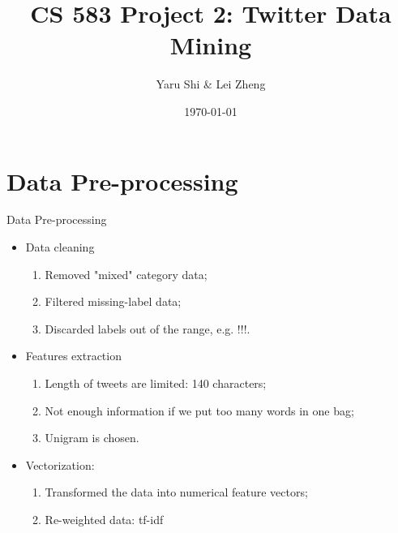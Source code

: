 \documentclass{beamer}
\title[Your Short Title]{CS 583 Project 2: Twitter Data Mining}
\author{Yaru Shi \& Lei Zheng}
\institute{University of Illinois at Chicago}
\date{\today}
\begin{document}
\begin{frame}
  \titlepage
\end{frame}


\section{Data Pre-processing}

\begin{frame}{Data Pre-processing}

\begin{itemize}
  \item Data cleaning
  	\begin{enumerate}
  		\item  Removed "mixed" category data;
  		\item Filtered missing-label data;
  		\item Discarded labels out of the range, e.g. !!!.
  	\end{enumerate} 
  \vskip 0.25cm
  \item Features extraction
    \begin{enumerate}
    	\item Length of tweets are limited: 140 characters;
    	\item Not enough information if we put too many words in one bag;
    	\item Unigram is chosen.
    \end{enumerate}
  \vskip 0.25cm
  \item Vectorization:
  	\begin{enumerate}
  		\item Transformed the data into numerical feature vectors;
  		\item Re-weighted data: tf-idf %
  	\end{enumerate}
  \vskip 0.5cm  
\end{itemize}



\end{frame}
\end{document}
